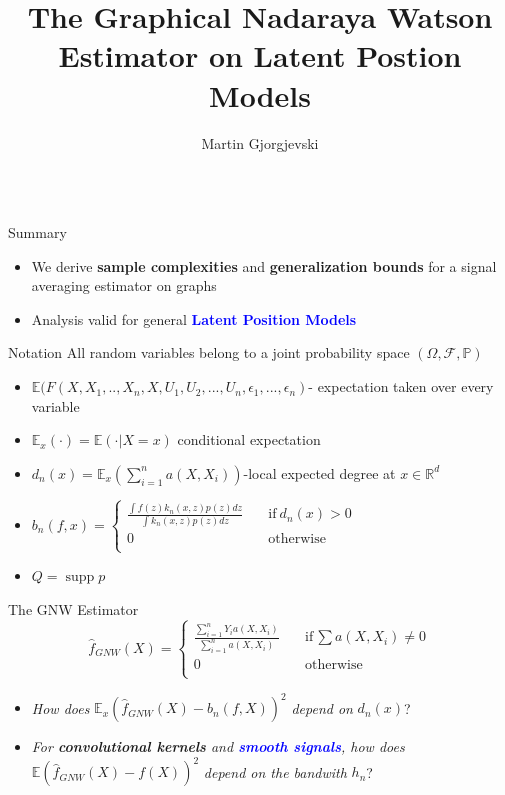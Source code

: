 \documentclass[final,dvipsnames]{beamer}
\author[Martin.Gjorgjevski@gipsa-lab.grenoble-inp.fr]{Martin Gjorgjevski}
\title{The Graphical Nadaraya Watson Estimator on Latent Postion Models}
\institute{GIPSA-lab, Grenoble}
\newcommand{\myemphh}[1]{\textbf{\textcolor{blue}{#1}}}
\DeclareMathOperator\supp{supp}
\begin{document}
\begin{frame}
\begin{columns}[T]
\begin{column}{0.38\textwidth}

\begin{block}{Summary}
\begin{itemize}
\item We derive \textbf{sample complexities} and \textbf{generalization bounds} for a signal averaging estimator on graphs
\item  Analysis valid for general  \myemphh{Latent Position Models}
\end{itemize}
\end{block}
\begin{block}{Notation}
All random variables belong to a joint probability space $(\Omega,\mathcal{F},\mathbb{P})$
\vspace{20pt}
\begin{itemize}
    \item $\mathbb{E}(F(X,X_1,..,X_n,X,U_1,U_2,...,U_n,\epsilon_1,...,\epsilon_n)$- expectation taken over every variable 
    \item $\mathbb{E}_{x} (\cdot)=\mathbb{E}(\cdot|X=x)$ conditional expectation 
    \item $d_n(x)=\mathbb{E}_{x}(\sum_{i=1}^n a(X,X_i))$-local expected degree at $x\in\mathbb{R}^d$
    \item $b_n(f,x)=\begin{cases}
    \frac{\int f(z)k_n(x,z)p(z)dz}{\int k_n(x,z)p(z)dz} \quad &\text{if}\ d_n(x)> 0\\
    0 \quad &\text{otherwise}\\
    \end{cases}$
    \item $Q=\supp{p}$
\end{itemize}
\end{block}

\begin{block}{The GNW Estimator}
\begin{equation}
    \hat{f}_{GNW}(X)=\begin{cases}
    \frac{\sum_{i=1}^n Y_i a(X,X_i)}{\sum_{i=1}^n a(X,X_i)} \quad &\text{if}\,\sum a(X,X_i)\neq 0\\
    0 \quad &\text{otherwise}\\
    \end{cases}
\end{equation}
\vspace{20pt}
\begin{itemize}
    \item \textit{How does} $\mathbb{E}_{x}(\hat{f}_{GNW}(X)-b_n(f,X))^2$ \textit{depend on} $d_n(x)$?
    \item \textit{For \textbf{convolutional kernels} and \myemphh{smooth signals},   
    how does} $\mathbb{E}
(\hat{f}_{GNW}(X)-f(X))^2$ \textit{depend on the bandwith} $h_n$?
\end{itemize}


\end{block}
\end{column}
\end{columns}
\end{frame}
\end{document}
